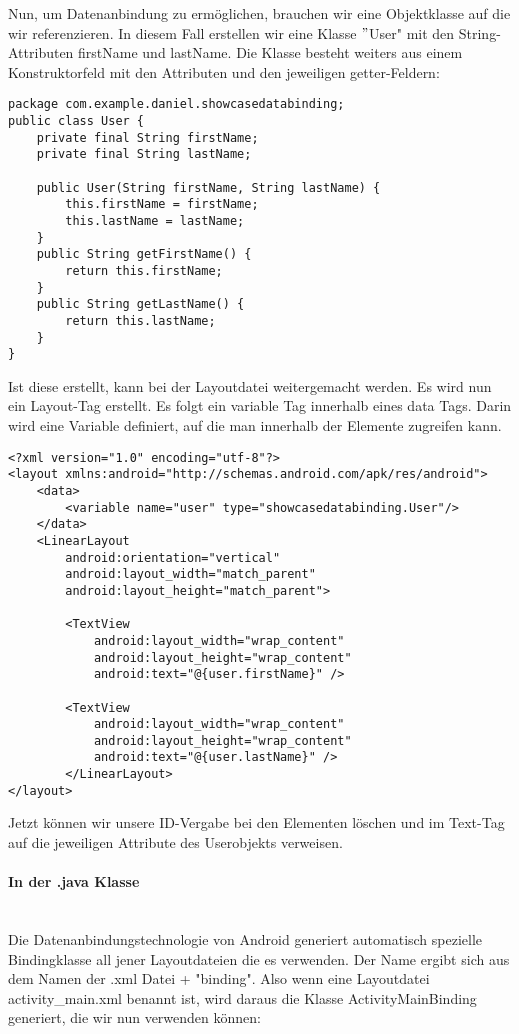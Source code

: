 \documentclass[FIPLY_base.tex]{subfiles}
\begin{document}
Nun, um Datenanbindung zu ermöglichen, brauchen wir eine Objektklasse auf die wir referenzieren. In diesem Fall erstellen wir eine Klasse $"$User" mit den String-Attributen firstName und lastName. Die Klasse besteht weiters aus einem Konstruktorfeld mit den Attributen und den jeweiligen getter-Feldern: 

\begin{lstlisting}[caption={Unsere Objektklasse die bei der Datenanbindung referenziert wird.},label=DescriptiveLabel]
package com.example.daniel.showcasedatabinding;
public class User {
    private final String firstName;
    private final String lastName;

    public User(String firstName, String lastName) {
        this.firstName = firstName;
        this.lastName = lastName;
    }
    public String getFirstName() {
        return this.firstName;
    }
    public String getLastName() {
        return this.lastName;
    }
}
\end{lstlisting}

Ist diese erstellt, kann bei der Layoutdatei weitergemacht werden. Es wird nun ein Layout-Tag erstellt. Es folgt ein variable Tag innerhalb eines data Tags. Darin wird eine Variable definiert, auf die man innerhalb der Elemente zugreifen kann.

\begin{lstlisting}[caption={Die XML Datei nach der Integration einer Datenanbindung.},label=DescriptiveLabel]
<?xml version="1.0" encoding="utf-8"?>
<layout xmlns:android="http://schemas.android.com/apk/res/android">
    <data>
	    <variable name="user" type="showcasedatabinding.User"/>
    </data>
    <LinearLayout
	    android:orientation="vertical"
	    android:layout_width="match_parent"
	    android:layout_height="match_parent">
    
	    <TextView
	        android:layout_width="wrap_content"
	        android:layout_height="wrap_content"
	        android:text="@{user.firstName}" />
		    
	    <TextView
	        android:layout_width="wrap_content"
	        android:layout_height="wrap_content"
	        android:text="@{user.lastName}" />
	    </LinearLayout>
</layout>
\end{lstlisting}


Jetzt können wir unsere ID-Vergabe bei den Elementen löschen und im Text-Tag auf die jeweiligen Attribute des Userobjekts verweisen.

\newpage
\paragraph{In der .java Klasse}
\ \\
Die Datenanbindungstechnologie von Android generiert automatisch spezielle Bindingklasse all jener Layoutdateien die es verwenden. Der Name ergibt sich aus dem Namen der .xml Datei + "binding". Also wenn eine Layoutdatei activity\_main.xml benannt ist, wird daraus die Klasse ActivityMainBinding generiert, die wir nun verwenden können:
\end{document}
